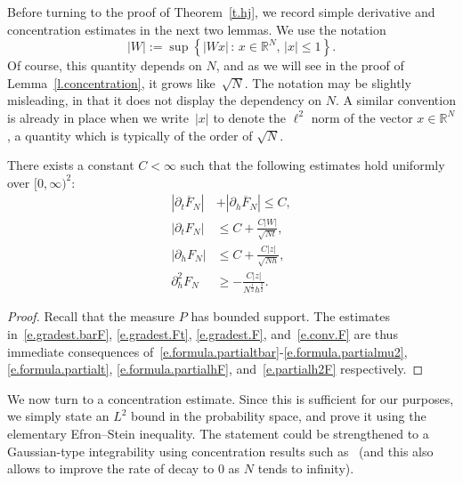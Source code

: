\documentclass[AHL,Unicode,longabstracts,published]{cedram}
\newcommand{\R}{\mathbb{R}}
\newcommand{\1}{\mathds{1}}
\renewcommand{\le}{\leqslant}
\renewcommand{\ge}{\geqslant}
\renewcommand{\bar}{\overline}
\begin{document}
Before turning to the proof of Theorem~\ref{t.hj}, we record simple derivative and concentration estimates in the next two lemmas. We use the notation
\[
|W| := \sup \left\{|W x| \, : \, x \in \R^N, \, |x|\le 1\right\}.
\]
Of course, this quantity depends on $N$, and as we will see in the proof of Lemma~\ref{l.concentration}, it grows like~$\sqrt{N}$. The notation may be slightly misleading, in that it does not display the dependency on $N$. A similar convention is already in place when we write~$|x|$ to denote the $\ell^2$ norm of the vector $x \in \R^N$, a quantity which is typically of the order of $\sqrt{N}$.

\begin{lemm}\label{l.gradient}
There exists a constant $C < \infty$ such that the following estimates hold uniformly over $[0,\infty)^2$:
\begin{align}
\left|\partial_t \bar F_N\right| &+ \left|\partial_h \bar F_N\right|
\le C,\label{e.gradest.barF}
\\
\left|\partial_t F_N\right| &\le C + \frac{C|W|}{\sqrt{Nt}},\label{e.gradest.Ft}
\\
\left|\partial_h F_N\right| &\le C + \frac{C|z|}{\sqrt{Nh}},\label{e.gradest.F}
\\
\partial_h^2 F_N &\ge - \frac{C|z|}{N^\frac 1 2 h^\frac 3 2}.\label{e.conv.F}
\end{align}
\end{lemm}


\begin{proof}
Recall that the measure $P$ has bounded support. The estimates in~\eqref{e.gradest.barF}, \eqref{e.gradest.Ft}, \eqref{e.gradest.F}, and~\eqref{e.conv.F} are thus immediate consequences of~\eqref{e.formula.partialtbar}-\eqref{e.formula.partialmu2}, \eqref{e.formula.partialt}, \eqref{e.formula.partialhF}, and~\eqref{e.partialh2F} respectively.
\end{proof}


We now turn to a concentration estimate. Since this is sufficient for our purposes, we simply state an $L^2$ bound in the probability space, and prove it using the elementary Efron--Stein inequality. The statement could be strengthened to a Gaussian-type integrability using concentration results such as~\cite[Theorems~5.5 and~6.2]{blm} (and this also allows to improve the rate of decay to $0$ as $N$ tends to infinity).
\end{document}
